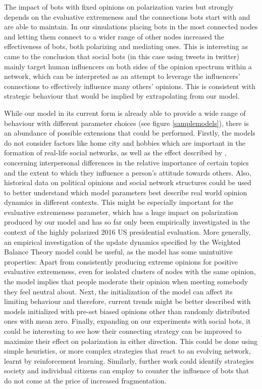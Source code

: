 \documentclass[11pt]{article}
\begin{document}
The impact of bots with fixed opinions on polarization varies but strongly depends on the evaluative extremeness and the connections bots start with and are able to maintain. In our simulations placing bots in the most connected nodes and letting them connect to a wider range of other nodes increased the effectiveness of bots, both polarizing and mediating ones. This is interesting as \citet{stella2018bots} came to the conclusion that social bots (in this case using tweets in twitter) mainly target human influencers on both sides of the opinion spectrum within a network, which can be interpreted as an attempt to leverage the influencers' connections to effectively influence many others' opinions. This is consistent with strategic behaviour that would be implied by extrapolating from our model. 

While our model in its current form is already able to provide a wide range of behaviour with different parameter choices (see figure \ref{samplemodels}), there is an abundance of possible extensions that could be performed. 
Firstly, the models do not consider factors like home city and hobbies which are important in the formation of real-life social networks, as well as the effect described by \citet{krosnick1990}, concerning interpersonal differences in the relative importance of certain topics and the extent to which they influence a person's attitude towards others. Also, historical data on political opinions and social network structures could be used to better understand which model parameters best describe real world opinion dynamics in different contexts. This might be especially important for the evaluative extremeness parameter, which has a huge impact on polarization produced by our model and has so far only been empirically investigated in the context of the highly polarized 2016 US presidential evaluation. More generally, an empirical investigation of the update dynamics specified by the Weighted Balance Theory model could be useful, as the model has some unintuitive properties: Apart from consistently producing extreme opinions for positive evaluative extremeness, even for isolated clusters of nodes with the same opinion, the model implies that people moderate their opinion when meeting somebody they feel neutral about. 
Next, the initialization of the model can affect its limiting behaviour and therefore, current trends might be better described with models initialized with pre-set biased opinions other than randomly distributed ones with mean zero.
Finally, expanding on our experiments with social bots, it could be interesting to see how their connecting strategy can be improved to maximize their effect on polarization in either direction. This could be done using simple heuristics, or more complex strategies that react to an evolving network, learnt by reinforcement learning. Similarly, further work could identify strategies society and individual citizens can employ to counter the influence of bots that do not come at the price of increased fragmentation. 
\end{document}
